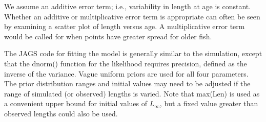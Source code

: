 \documentclass[
]{krantz}
\begin{document}
We assume an additive error term; i.e., variability in length at age is constant. Whether an additive or multiplicative error term is appropriate can often be seen by examining a scatter plot of length versus age. A multiplicative error term would be called for when points have greater spread for older fish.

The JAGS code for fitting the model is generally similar to the simulation, except that the dnorm() function for the likelihood requires precision, defined as the inverse of the variance. Vague uniform priors are used for all four parameters. The prior distribution ranges and initial values may need to be adjusted if the range of simulated (or observed) lengths is varied. Note that max(Len) is used as a convenient upper bound for initial values of \(L_\infty\), but a fixed value greater than observed lengths could also be used.
\end{document}
